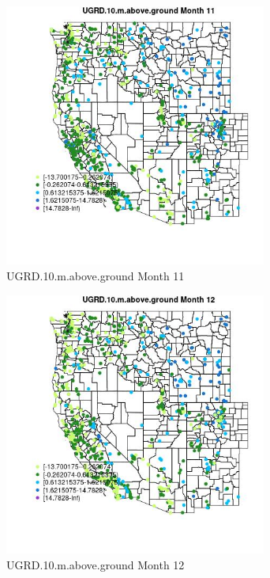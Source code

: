 \begin{figure} 
\centering  
\includegraphics[width=0.77\textwidth]{Code_Outputs/Report_ML_input_PM25_Step4_part_f_de_duplicated_aves_prioritize_24hr_obswNAs_MapObsMo11UGRD10maboveground.jpg} 
\caption{\label{fig:Report_ML_input_PM25_Step4_part_f_de_duplicated_aves_prioritize_24hr_obswNAsMapObsMo11UGRD10maboveground}UGRD.10.m.above.ground Month 11} 
\end{figure} 
 

\begin{figure} 
\centering  
\includegraphics[width=0.77\textwidth]{Code_Outputs/Report_ML_input_PM25_Step4_part_f_de_duplicated_aves_prioritize_24hr_obswNAs_MapObsMo12UGRD10maboveground.jpg} 
\caption{\label{fig:Report_ML_input_PM25_Step4_part_f_de_duplicated_aves_prioritize_24hr_obswNAsMapObsMo12UGRD10maboveground}UGRD.10.m.above.ground Month 12} 
\end{figure} 
 

